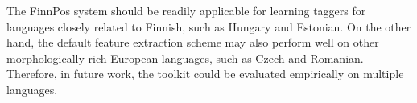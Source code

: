 \documentclass[smallextended]{svjour3}       %
\begin{document}
The FinnPos system should be readily applicable for learning taggers for languages closely related to Finnish, such as Hungary and Estonian. On the other hand, the default feature extraction scheme may also perform well on other morphologically rich European languages, such as Czech and Romanian. Therefore, in future work, the toolkit  could be evaluated empirically on multiple languages.


\newpage
%


\end{document}
